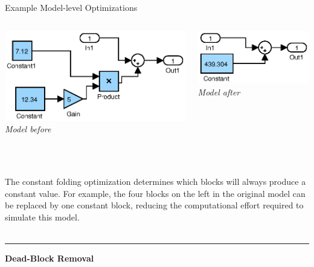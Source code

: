 \documentclass[final,hyperref={pdfpagelabels=false}]{beamer}
\begin{document}
\begin{frame}{}
\begin{columns}[t,totalwidth=\linewidth]
\begin{column}{.585\linewidth}
\begin{block}{Example Model-level Optimizations}
\begin{columns}[c,totalwidth=\linewidth]
\begin{column}{.485\linewidth}
\begin{center}
        \includegraphics[width=0.8\linewidth]{images/models/Const1}\\
        \footnotesize \textit{Model before}
        \end{center}
        \end{column}
        \begin{column}{.485\linewidth}
        \begin{center}
        \vspace{0.9cm}
        \includegraphics[width=0.7\linewidth]{images/models/Const1_export}\\
        \footnotesize \textit{Model after}
        \end{center}
        \end{column}
        \end{columns}
        \footnotesize ~\\~\\
        The constant folding optimization determines which blocks will always produce a constant value. For example, the four blocks on the left in the original model can be replaced by one constant block, reducing the computational effort required to simulate this model.
         ~\\~\\
         \hrule
         
         \small
          \begin{center}\textbf{Dead-Block Removal}\end{center}
                 \vspace{-0.3cm}
         \begin{columns}[c,totalwidth=\linewidth]
         \begin{column}{.485\linewidth}
         \begin{center}
         

\end{center}
\end{column}
\end{columns}
\end{block}
\end{column}
\end{columns}
\end{frame}
\end{document}
